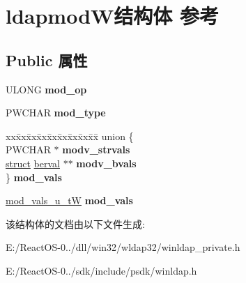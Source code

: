 \hypertarget{structldapmod_w}{}\section{ldapmod\+W结构体 参考}
\label{structldapmod_w}
\subsection*{Public 属性}
\begin{DoxyCompactItemize}
\item 
\mbox{\label{structldapmod_w_a5457da97cfc7af2b15b39bbb5d289e31}} 
U\+L\+O\+NG {\bfseries mod\+\_\+op}
\item 
\mbox{\label{structldapmod_w_a6b2a161d215c9c7dd16eb29910d416c1}} 
P\+W\+C\+H\+AR {\bfseries mod\+\_\+type}
\item 
\mbox{\label{structldapmod_w_af77b99ee75f1b5b8d18cd279f86da438}} 
\begin{tabbing}
xx\=xx\=xx\=xx\=xx\=xx\=xx\=xx\=xx\=\kill
union \{\\
\>PWCHAR $\ast$ {\bfseries modv\_strvals}\\
\>\hyperlink{interfacestruct}{struct} \hyperlink{structberval}{berval} $\ast$$\ast$ {\bfseries modv\_bvals}\\
\} {\bfseries mod\_vals}\\

\end{tabbing}\item 
\mbox{\label{structldapmod_w_a8c1afc0dd6b0777b86d0ac9d5fc44598}} 
\hyperlink{unionmod__vals__u_w}{mod\+\_\+vals\+\_\+u\+\_\+tW} {\bfseries mod\+\_\+vals}
\end{DoxyCompactItemize}


该结构体的文档由以下文件生成\+:\begin{DoxyCompactItemize}
\item 
E\+:/\+React\+O\+S-\/0../dll/win32/wldap32/winldap\+\_\+private.\+h\item 
E\+:/\+React\+O\+S-\/0../sdk/include/psdk/winldap.\+h\end{DoxyCompactItemize}
